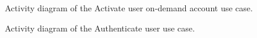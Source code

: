 \documentclass[12pt]{article}
\begin{document}
\begin{figure}[H]
\centering	
{}
\caption{Activity diagram of the Activate user on-demand account use case.}
\end{figure}

\begin{figure}[H]
\centering	
{}
\caption{Activity diagram of the Authenticate user use case.}
\end{figure}
\end{document}
